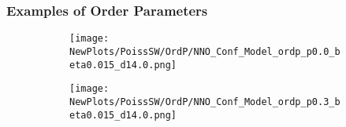 \documentclass[xcolor={dvipsnames}, aspectratio = 43]{beamer}
\begin{document}
\begin{frame}
	\frametitle{Examples of Order Parameters}
	\begin{figure}[t]
		\begin{subfigure}[t]{0.54\linewidth}
			\vspace{-.5cm}
			\centering
			\texttt{[image: NewPlots/PoissSW/OrdP/NNO\_Conf\_Model\_ordp\_p0.0\_beta0.015\_d14.0.png]} 
			\label{fig:Ordp_OPSW_COVID19_D14}
		\end{subfigure}
		\begin{subfigure}[t]{0.54\linewidth}
			\vspace{-0.5cm}
			\centering
			\texttt{[image: NewPlots/PoissSW/OrdP/NNO\_Conf\_Model\_ordp\_p0.3\_beta0.015\_d14.0.png]}
			\label{fig:Ordp_OPSW_highmu_COVID19}
		\end{subfigure}
		\label{fig:Ordp_OPSW_COVID19_panel}
	\end{figure}
\end{frame}
\end{document}
